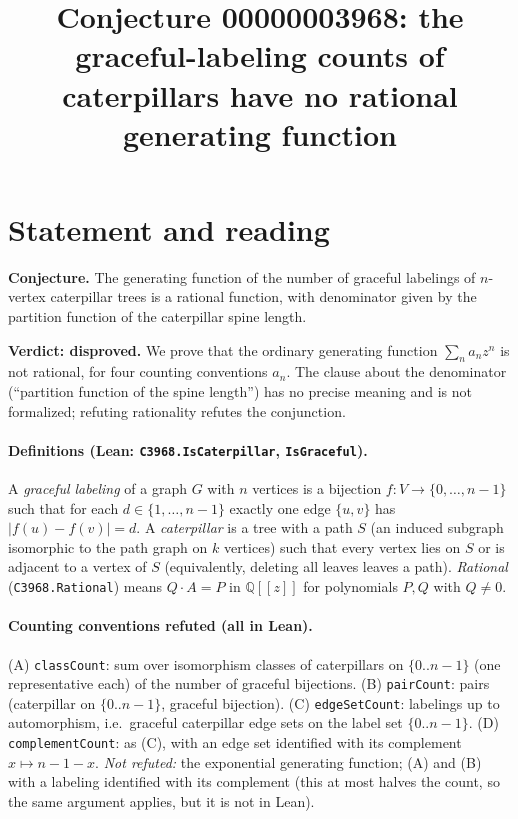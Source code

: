 \documentclass[11pt]{article}
\begin{document}
\title{Conjecture 00000003968: the graceful-labeling counts of caterpillars have no rational generating function}
\author{}
\date{}
\maketitle

\section*{Statement and reading}
\textbf{Conjecture.} The generating function of the number of graceful labelings of $n$-vertex caterpillar trees is a rational function, with denominator given by the partition function of the caterpillar spine length.

\textbf{Verdict: disproved.} We prove that the ordinary generating function $\sum_n a_n z^n$ is not rational, for four counting conventions $a_n$. The clause about the denominator (``partition function of the spine length'') has no precise meaning and is not formalized; refuting rationality refutes the conjunction.

\paragraph{Definitions (Lean: \texttt{C3968.IsCaterpillar}, \texttt{IsGraceful}).}
A \emph{graceful labeling} of a graph $G$ with $n$ vertices is a bijection $f:V\to\{0,\dots,n-1\}$ such that for each $d\in\{1,\dots,n-1\}$ exactly one edge $\{u,v\}$ has $|f(u)-f(v)|=d$. A \emph{caterpillar} is a tree with a path $S$ (an induced subgraph isomorphic to the path graph on $k$ vertices) such that every vertex lies on $S$ or is adjacent to a vertex of $S$ (equivalently, deleting all leaves leaves a path). \emph{Rational} (\texttt{C3968.Rational}) means $Q\cdot A=P$ in $\mathbb{Q}[[z]]$ for polynomials $P,Q$ with $Q\neq 0$.

\paragraph{Counting conventions refuted (all in Lean).}
(A) \texttt{classCount}: sum over isomorphism classes of caterpillars on $\{0..n-1\}$ (one representative each) of the number of graceful bijections. (B) \texttt{pairCount}: pairs (caterpillar on $\{0..n-1\}$, graceful bijection). (C) \texttt{edgeSetCount}: labelings up to automorphism, i.e.\ graceful caterpillar edge sets on the label set $\{0..n-1\}$. (D) \texttt{complementCount}: as (C), with an edge set identified with its complement $x\mapsto n-1-x$.
\emph{Not refuted:} the exponential generating function; (A) and (B) with a labeling identified with its complement (this at most halves the count, so the same argument applies, but it is not in Lean).
\end{document}
